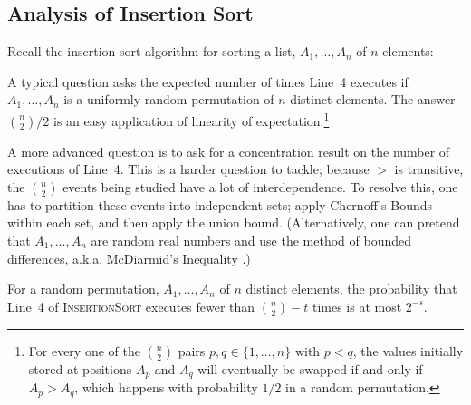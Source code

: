 \documentclass[lotsofwhite]{patmorin}
\begin{document}
\subsection{Analysis of Insertion Sort}

Recall the insertion-sort algorithm for sorting a list, $A_1,\ldots,A_n$
of $n$ elements:

\begin{algorithmic}[1]
     \ENDWHILE
  \ENDFOR
\end{algorithmic}

A typical question asks the expected number of times Line~4 executes
if $A_1,\ldots,A_n$ is a uniformly random permutation of $n$ distinct
elements.  The answer $\binom{n}{2}/2$ is an easy application of
linearity of expectation.\footnote{For every one of the $\binom{n}{2}$
pairs $p,q\in\{1,\ldots,n\}$ with $p<q$, the values initially stored at
positions $A_p$ and $A_q$ will eventually be swapped if and only if $A_p >
A_q$, which happens with probability $1/2$ in a random permutation.}

A more advanced question is to ask for a concentration result on the
number of executions of Line~4. This is a harder question to tackle;
because $>$ is transitive, the $\binom{n}{2}$ events being studied have
a lot of interdependence. To resolve this, one has to partition these
events into independent sets; apply Chernoff's Bounds within each set,
and then apply the union bound.  (Alternatively, one can pretend that
$A_1,\ldots,A_n$ are random real numbers and use the method of bounded
differences, a.k.a. McDiarmid's Inequality \cite{X}.)

\begin{thm}
For a random permutation, $A_1,\ldots,A_n$ of $n$ distinct elements, the probability that Line~4 of \textsc{InsertionSort} executes fewer than $\binom{n}{2}-t$ times is at most $2^{-s}$.
\end{thm}
\end{document}
